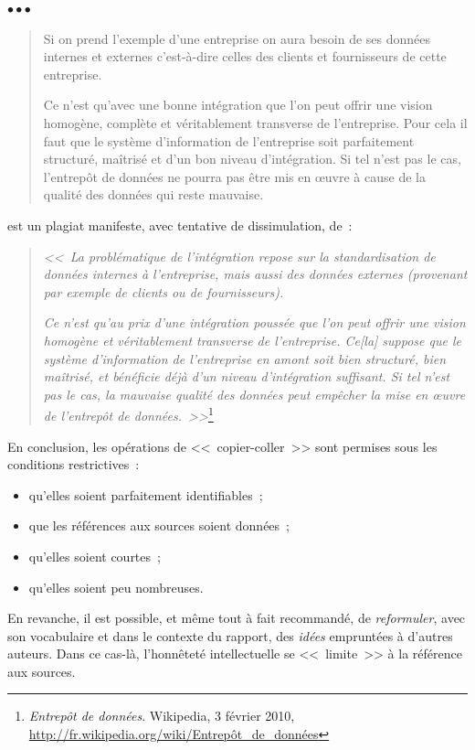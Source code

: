 \documentclass[11pt, french, screen, research-development]{report-rd-info}
\newenvironment{explanation}
{\color{blue}
 \begin{list}{}{\hspace{0.2\textwidth}\color{blue}}\item $\bullet\bullet\bullet$
}
{\end{list}}
\begin{document}
\begin{explanation}
\begin{quote}
      Si on prend l'exemple d'une entreprise on aura besoin de ses données internes et externes c'est-à-dire celles des clients et fournisseurs de cette entreprise.

      Ce n'est qu'avec une bonne intégration que l'on peut offrir une vision homogène, complète et véritablement transverse de l'entreprise.
      Pour cela il faut que le système d'information de l'entreprise soit parfaitement structuré, maîtrisé et d'un bon niveau d'intégration.
      Si tel n'est pas le cas, l'entrepôt de données ne pourra pas être mis en \oe uvre à cause de la qualité des données qui reste mauvaise.
   \end{quote}
   est un plagiat manifeste, avec tentative de dissimulation, de~:
   \begin{quote}
      \emph{<<~La problématique de l'intégration repose sur la standardisation de données internes à l'entreprise, mais aussi des données externes (provenant par exemple de clients ou de fournisseurs).}

      \emph{Ce n'est qu'au prix d'une intégration poussée que l'on peut offrir une vision homogène et véritablement transverse de l'entreprise.
         Ce[la] suppose que le système d'information de l'entreprise en amont soit bien structuré, bien maîtrisé, et bénéficie déjà d'un niveau d'intégration suffisant.
         Si tel n'est pas le cas, la mauvaise qualité des données peut empêcher la mise en \oe uvre de l'entrepôt de données.~>>}\footnote{\emph{Entrepôt de données}. Wikipedia, 3 février 2010, \url{http://fr.wikipedia.org/wiki/Entrepôt_de_données}}
   \end{quote}

   \vspace{2\baselineskip}

   En conclusion, les opérations de <<~copier-coller~>> sont permises sous les conditions restrictives~:
   \begin{itemize}
      \item qu'elles soient parfaitement identifiables~;
      \item que les références aux sources soient données~;
      \item qu'elles soient courtes~;
      \item qu'elles soient peu nombreuses.
   \end{itemize}

   En revanche, il est possible, et même tout à fait recommandé, de \emph{reformuler}, avec son vocabulaire et dans le contexte du rapport, des \emph{idées} empruntées à d'autres auteurs.
   Dans ce cas-là, l'honnêteté intellectuelle se <<~limite~>> à la référence aux sources.


\end{explanation}
\end{document}
